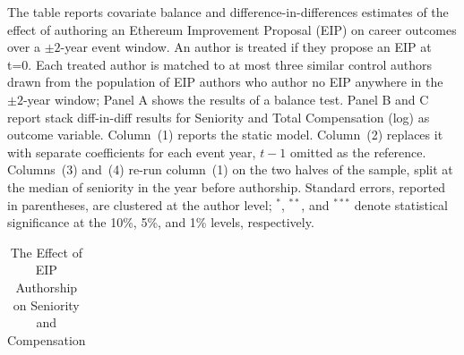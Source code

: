 \begin{center}
\begin{table}
 \caption{The Effect of EIP Authorship on Seniority and Compensation}
 \label{tab:did_main}
     \begin{small}
    \begin{minipage}{\textwidth}
      The table reports covariate balance and difference-in-differences estimates of the effect of authoring an Ethereum Improvement Proposal (EIP) on career outcomes over a $\pm2$-year event window. An author is treated if they propose an EIP at t=0. Each treated author is matched to at most three similar control authors drawn from the population of EIP authors who author no EIP anywhere in the $\pm2$-year window; Panel A shows the results of a balance test. Panel B and C report stack diff-in-diff results for Seniority and Total Compensation (log) as outcome variable. Column~(1) reports the static model. Column~(2) replaces it with separate coefficients for each event year, $t-1$ omitted as the reference. Columns~(3) and~(4) re-run column~(1) on the two halves of the sample, split at the median of seniority in the year before authorship. Standard errors, reported in parentheses, are clustered at the author level; $^{*}$, $^{**}$, and $^{***}$ denote statistical significance at the 10\%, 5\%, and 1\% levels, respectively.
  \end{minipage}
         \end{small}
\begin{tabular}{lcccccc}
\\


\end{tabular}
\end{table}
\end{center}
